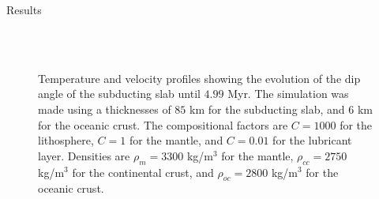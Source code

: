 \documentclass[final]{beamer}
\newlength{\colwidth}
\begin{document}
\begin{frame}[t]
\begin{columns}[t]
\begin{column}{\colwidth}
  \begin{block}{Results}

  \begin{figure}
		\centering
  		\\
  		\\
  \caption{Temperature and velocity profiles showing the evolution of the dip angle of the subducting slab until $4.99$ Myr. The simulation was made using a thicknesses of $85$ km for the subducting slab, and $6$ km for the oceanic crust. The compositional factors are $C = 1000$ for the lithosphere, $C=1$ for the mantle, and $C=0.01$ for the lubricant layer. Densities are $\rho_m=3300$ kg/m$^3$ for the mantle, $\rho_{cc}=2750$ kg/m$^3$ for the continental crust, and $\rho_{oc}=2800$ kg/m$^3$ for the oceanic crust.}
  \label{fig:result1}
  \end{figure}
  

\end{block}
\end{column}
\end{columns}
\end{frame}
\end{document}
